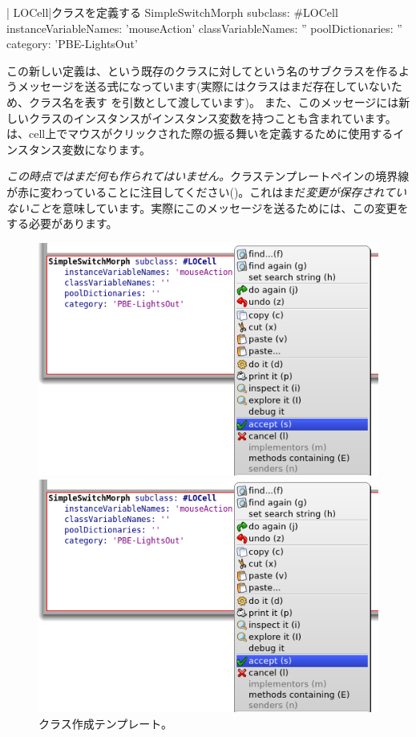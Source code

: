 \documentclass[a4paper,10pt,twoside]{book}
\begin{document}
\begin{classdef}[firstClassDef]{\ct| LOCell|クラスを定義する}
SimpleSwitchMorph subclass: #LOCell
   instanceVariableNames: 'mouseAction'
   classVariableNames: ''
   poolDictionaries: ''
   category: 'PBE-LightsOut'
\end{classdef}

この新しい定義は、という既存のクラスに対してという名のサブクラスを作るようメッセージを送る\st 式になっています(実際にはクラスはまだ存在していないため、クラス名を表す を引数として渡しています)。
また、このメッセージには新しいクラスのインスタンスがインスタンス変数を持つことも含まれています。は、cell上でマウスがクリックされた際の振る舞いを定義するために使用するインスタンス変数になります。

\emph{この時点ではまだ何も作られてはいません。}クラステンプレートペインの境界線が赤に変わっていることに注目してください()。これはまだ\emph{変更が保存されていないこと}を意味しています。実際にこのメッセージを送るためには、この変更をする必要があります。

\begin{figure}[h!t]
\ifluluelse
	{\centerline {\includegraphics[width=\textwidth]{AcceptClassDef}}}
	{\centerline {\includegraphics[scale=0.7]{AcceptClassDef}}}
\caption{クラス作成テンプレート。
}
\end{figure}
\end{document}
